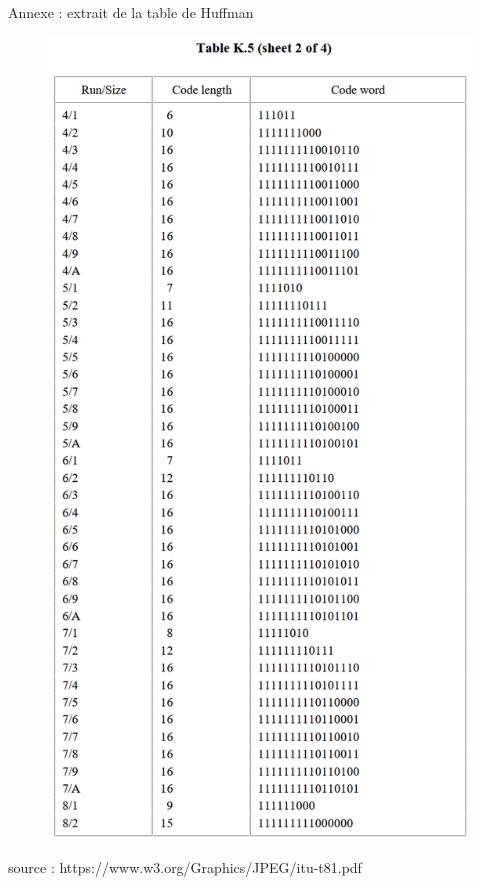 \documentclass[xcolor=dvipsnames]{beamer}
\begin{document}
\begin{frame}{Annexe : extrait de la table de Huffman}
\begin{minipage}{.49\textwidth}
\begin{figure}
            \includegraphics[width=.7\linewidth]{huffman2.png}
        \end{figure}
    \end{minipage}
    \hfill
    \centering
    \scriptsize
    source : https://www.w3.org/Graphics/JPEG/itu-t81.pdf
\end{frame}
\end{document}
